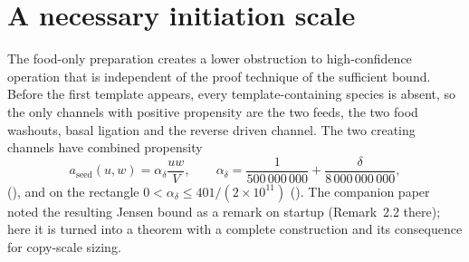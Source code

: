 \documentclass[11pt,a4paper]{article}
\theoremstyle{plain}
\theoremstyle{definition}
\theoremstyle{remark}
\newcommand{\aseed}{a_{\mathrm{seed}}}
\begin{document}
\section{A necessary initiation scale}\label{sec:init}

The food-only preparation creates a lower obstruction to high-confidence operation that is independent of the proof technique of the sufficient bound. Before the first template appears, every template-containing species is absent, so the only channels with positive propensity are the two feeds, the two food washouts, basal ligation and the reverse driven channel. The two creating channels have combined propensity
\begin{equation}\label{eq:seedrate}
 \aseed(u,w)=\alpha_\delta\frac{uw}{V},\qquad \alpha_\delta=\frac1{500\,000\,000}+\frac{\delta}{8\,000\,000\,000},
\end{equation}
(), and on the rectangle $0<\alpha_\delta\le401/(2\times10^{11})$ (). The companion paper noted the resulting Jensen bound as a remark on startup (Remark~2.2 there); here it is turned into a theorem with a complete construction and its consequence for copy-scale sizing.
\end{document}

